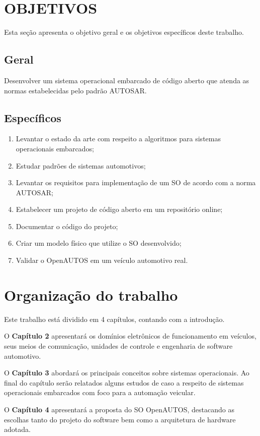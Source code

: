 \section{OBJETIVOS}

Esta seção apresenta o objetivo geral e os objetivos específicos deste trabalho.

\subsection{Geral}

Desenvolver um sistema operacional embarcado de código aberto que atenda as normas estabelecidas pelo padrão AUTOSAR.

\subsection{Específicos}
\begin{enumerate}
	\item Levantar o estado da arte com respeito a algoritmos para sistemas operacionais embarcados;
	\item Estudar padrões de sistemas automotivos;
	\item Levantar os requisitos para implementação de um SO de acordo com a norma AUTOSAR;
	\item Estabelecer um projeto de código aberto em um repositório online;
	\item Documentar o código do projeto;
	\item Criar um modelo físico que utilize o SO desenvolvido;
	\item Validar o OpenAUTOS em um veículo automotivo real.
\end{enumerate}

\section{Organização do trabalho}

Este trabalho está dividido em 4 capítulos, contando com a introdução.

O \textbf{Capítulo 2} apresentará os domínios eletrônicos de funcionamento em veículos, seus meios de comunicação, unidades de controle e engenharia de software automotivo.

O \textbf{Capítulo 3} abordará os principais conceitos sobre sistemas operacionais. Ao final do capítulo serão relatados alguns estudos de caso a respeito de sistemas operacionais embarcados com foco para a automação veicular.

O \textbf{Capítulo 4} apresentará a proposta do SO OpenAUTOS, destacando as escolhas tanto do projeto do software bem como a arquitetura de hardware adotada.